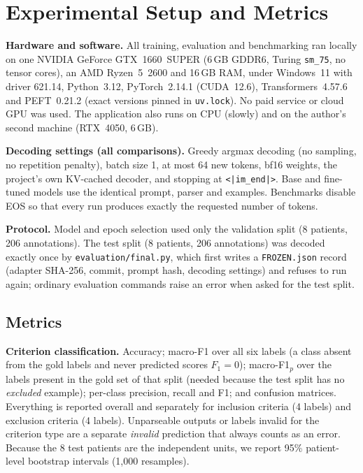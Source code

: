 \section{Experimental Setup and Metrics}\label{sec:setup}
\textbf{Hardware and software.} All training, evaluation and benchmarking ran locally on one NVIDIA GeForce
GTX~1660~SUPER (6\,GB GDDR6, Turing \texttt{sm\_75}, no tensor cores), an AMD Ryzen~5~2600 and 16\,GB RAM, under
Windows~11 with driver 621.14, Python~3.12, PyTorch~2.14.1 (CUDA~12.6), Transformers~4.57.6 and PEFT~0.21.2
(exact versions pinned in \texttt{uv.lock}). No paid service or cloud GPU was used. The application also runs on
CPU (slowly) and on the author's second machine (RTX~4050, 6\,GB).

\textbf{Decoding settings (all comparisons).} Greedy argmax decoding (no sampling, no repetition penalty), batch
size 1, at most 64 new tokens, bf16 weights, the project's own KV-cached decoder, and stopping at
\texttt{<|im\_end|>}. Base and fine-tuned models use the identical prompt, parser and examples. Benchmarks
disable EOS so that every run produces exactly the requested number of tokens.

\textbf{Protocol.} Model and epoch selection used only the validation split (8 patients, 206 annotations).
The test split (8 patients, 206 annotations) was decoded exactly once by \texttt{evaluation/final.py}, which first
writes a \texttt{FROZEN.json} record (adapter SHA-256, commit, prompt hash, decoding settings) and refuses to
run again; ordinary evaluation commands raise an error when asked for the test split.

\subsection{Metrics}\label{sec:metrics}
\textbf{Criterion classification.} Accuracy; macro-F1 over all six labels (a class absent from the gold
labels and never predicted scores $F_1=0$); macro-F1$_p$ over the labels present in the gold set of that
split (needed because the test split has no \emph{excluded} example); per-class precision, recall and F1;
and confusion matrices. Everything is reported overall and separately for inclusion criteria (4 labels)
and exclusion criteria (4 labels). Unparseable outputs or labels invalid for the criterion type are a
separate \emph{invalid} prediction that always counts as an error. Because the 8 test patients are the
independent units, we report 95\% patient-level bootstrap intervals (1{,}000 resamples).

